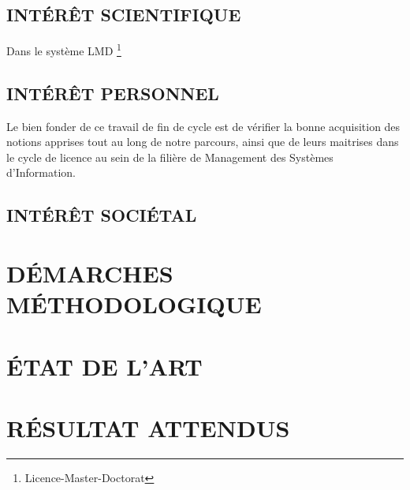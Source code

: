 \documentclass[a4paper,12pt,oneside]{book}
\begin{document}
\subsection[Interet scientifique]{INTÉRÊT SCIENTIFIQUE}
Dans le système LMD \footnote[1]{Licence-Master-Doctorat}

\subsection[Interet personnel]{INTÉRÊT PERSONNEL}
Le bien fonder de ce travail de fin de cycle est de
vérifier la bonne acquisition des notions apprises tout
au long de notre parcours, ainsi que de leurs maitrises
dans le cycle de licence au sein de la filière de Management
des Systèmes d’Information.

\subsection[Interet societal]{INTÉRÊT SOCIÉTAL}

\section[Démarches méthodologiques]{DÉMARCHES MÉTHODOLOGIQUE}

\section[Etat de l'art]{ÉTAT DE L’ART}

\section[Résultats attenus]{RÉSULTAT ATTENDUS}

\printbibliography
\end{document}
